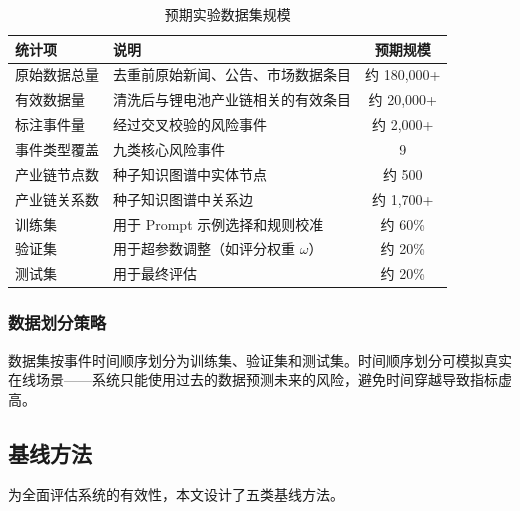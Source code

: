 \begin{table}[H]
\centering
\footnotesize
\caption{预期实验数据集规模}
\label{tab:dataset-stats}
\begin{tabularx}{0.95\linewidth}{l X c}
\toprule
\textbf{统计项} & \textbf{说明} & \textbf{预期规模} \\
\midrule
原始数据总量 & 去重前原始新闻、公告、市场数据条目 & 约 180,000+ \\
有效数据量 & 清洗后与锂电池产业链相关的有效条目 & 约 20,000+ \\
标注事件量 & 经过交叉校验的风险事件 & 约 2,000+ \\
事件类型覆盖 & 九类核心风险事件 & 9 \\
产业链节点数 & 种子知识图谱中实体节点 & 约 500 \\
产业链关系数 & 种子知识图谱中关系边 & 约 1,700+ \\
训练集 & 用于 Prompt 示例选择和规则校准 & 约 60\% \\
验证集 & 用于超参数调整（如评分权重 $\omega$） & 约 20\% \\
测试集 & 用于最终评估 & 约 20\% \\
\bottomrule
\end{tabularx}
\end{table}

\subsubsection{数据划分策略}

数据集按事件时间顺序划分为训练集、验证集和测试集。时间顺序划分可模拟真实在线场景——系统只能使用过去的数据预测未来的风险，避免时间穿越导致指标虚高。

\subsection{基线方法}
\label{sec:exp-baseline}

为全面评估\projectshort 系统的有效性，本文设计了五类基线方法。

